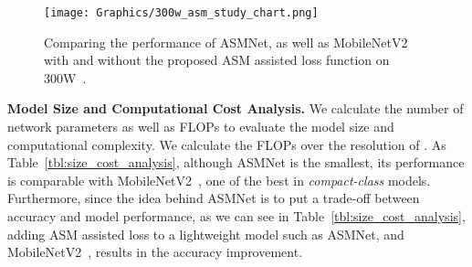 \documentclass[final]{cvpr}
\begin{document}
\begin{figure}[t!]
  \centering
  \texttt{[image: Graphics/300w\_asm\_study\_chart.png]}
  \caption{Comparing the performance of ASMNet, as well as MobileNetV2~\cite{sandler2018mobilenetv2} with and without the proposed ASM assisted loss function on 300W~\cite{sagonas2013300}.}
  \label{fig:300w_asm_study_chart}
\end{figure}




\begin{table}[]
\caption{Investigating the effect of using ASM assisted loss function both on MobileNetV2~\cite{sandler2018mobilenetv2} and ASMNet.}
\label{tbl:ASM-improvement-study}
\centering
\small
{}
\end{table}


\textbf{Model Size and Computational Cost Analysis.}
We calculate the number of network parameters as well as FLOPs to evaluate the model size and computational complexity. We calculate the FLOPs over the resolution of . As Table~\ref{tbl:size_cost_analysis}, although ASMNet is the smallest, its performance is comparable with MobileNetV2~\cite{sandler2018mobilenetv2}, one of the best in \textit{compact-class} models. Furthermore, since the idea behind ASMNet is to put a trade-off between accuracy and model performance, as we can see in Table~\ref{tbl:size_cost_analysis}, adding ASM assisted loss to a lightweight model such as ASMNet, and MobileNetV2~\cite{sandler2018mobilenetv2}, results in the accuracy improvement.
\end{document}
